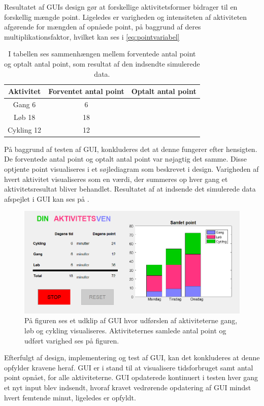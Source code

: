 Resultatet af GUIs design gør at forskellige aktivitetsformer bidrager til en forskellig mængde point. Ligeledes er varigheden og intensiteten  af aktiviteten afgørende for mængden af opnåede point, på baggrund af deres multiplikationsfaktor, hvilket kan ses i \eqref{eq:pointvariabel}
\begin{table}[H]
	\centering
	\begin{tabular}{ccc}
		\hline
		\rowcolor[HTML]{C0C0C0} 
		Aktivitet 	& Forventet antal point & Optalt antal point \\ \hline
		Gang 	  6 & 6	 \\ \hline
		Løb 	 18 & 18 \\ \hline
		Cykling  12 & 12 \\ \hline
	\end{tabular}
	\caption{I tabellen ses sammenhængen mellem forventede antal point og optalt antal point, som resultat af den indsendte simulerede data.}
	\label{test:GUI}
\end{table}\vspace{-.5cm}
På baggrund af testen af GUI, konkluderes det at denne fungerer efter hensigten. De forventede antal point og optalt antal point var nøjagtig det samme. Disse optjente point visualiseres i et søjlediagram som beskrevet i design. Varigheden af hvert aktivitet visualiseres som en værdi, der summeres op hver gang et aktivitetsresultat bliver behandlet. Resultatet af at indsende det simulerede data afspejlet i GUI kan ses på .

\begin{figure}[H]
	\centering
	\includegraphics[scale=0.7]{figures/cDesign/test_GUI.png}
	\caption{På figuren ses et udklip af GUI hvor udførslen af aktiviteterne gang, løb og cykling visualiseres. Aktiviteternes samlede antal point og udført varighed ses på figuren.}
	\label{fig:GUI}
\end{figure}

Efterfulgt af design, implementering og test af GUI, kan det konkluderes at denne opfylder kravene heraf. GUI er i stand til at visualisere tidsforbruget samt antal point opnået, for alle aktiviteterne. GUI opdaterede kontinuert i testen hver gang et nyt input blev indsendt, hvoraf kravet vedrørende opdatering af GUI mindst hvert femtende minut, ligeledes er opfyldt.